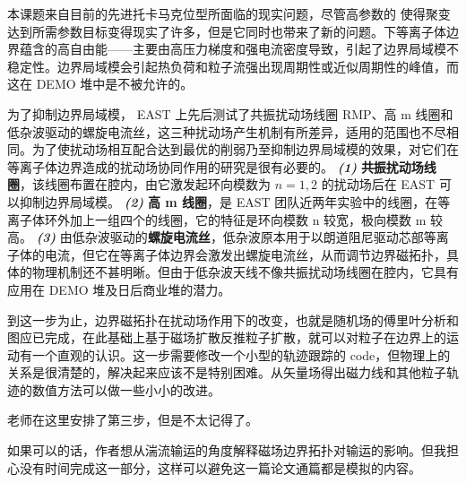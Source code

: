 \begin{cabstract}
  本课题来自目前的先进托卡马克位型所面临的现实问题，尽管高参数的 \Hmode 使得聚变达到所需参数目标变得现实了许多，但是它同时也带来了新的问题。\Hmode 下等离子体边界蕴含的高自由能——主要由高压力梯度和强电流密度导致，引起了边界局域模不稳定性。边界局域模会引起热负荷和粒子流强出现周期性或近似周期性的峰值，而这在 DEMO 堆中是不被允许的。

  为了抑制边界局域模， EAST 上先后测试了共振扰动场线圈 RMP、高 m 线圈和低杂波驱动的螺旋电流丝，这三种扰动场产生机制有所差异，适用的范围也不尽相同。为了使扰动场相互配合达到最优的削弱乃至抑制边界局域模的效果，对它们在等离子体边界造成的扰动场协同作用的研究是很有必要的。 \textit{\textbf{(1)}} \textbf{共振扰动场线圈}，该线圈布置在腔内，由它激发起环向模数为 $n=1,2$ 的扰动场后在 EAST 可以抑制边界局域模。 \textit{\textbf{(2)}} \textbf{高 m 线圈}，是 EAST 团队近两年实验中的线圈，在等离子体环外加上一组四个的线圈，它的特征是环向模数 n 较宽，极向模数 m 较高。 \textit{\textbf{(3)}} 由低杂波驱动的\textbf{螺旋电流丝}，低杂波原本用于以朗道阻尼驱动芯部等离子体的电流，但它在等离子体边界会激发出螺旋电流丝，从而调节边界磁拓扑，具体的物理机制还不甚明晰。但由于低杂波天线不像共振扰动场线圈在腔内，它具有应用在 DEMO 堆及日后商业堆的潜力。

  到这一步为止，边界磁拓扑在扰动场作用下的改变，也就是随机场的傅里叶分析和 \Poincare 图应已完成，在此基础上基于磁场扩散反推粒子扩散，就可以对粒子在边界上的运动有一个直观的认识。这一步需要修改一个小型的轨迹跟踪的 code，但物理上的关系是很清楚的，解决起来应该不是特别困难。从矢量场得出磁力线和其他粒子轨迹的数值方法可以做一些小小的改进。
  
  老师在这里安排了第三步，但是不太记得了。

  如果可以的话，作者想从湍流输运的角度解释磁场边界拓扑对输运的影响。但我担心没有时间完成这一部分，这样可以避免这一篇论文通篇都是模拟的内容。

\end{cabstract}


